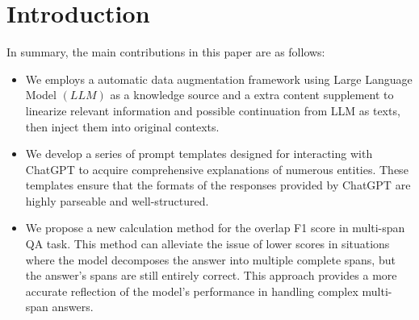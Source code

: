 \documentclass[mathematics,article,submit,moreauthors]{Definitions/mdpi}
\newcommand{\1}[1]{\mathds{1}\left[#1\right]}
\begin{document}

\section{Introduction}
\label{sec:intro}

In summary, the main contributions in this paper are as follows:
\begin{itemize}
	\item We employs a automatic data augmentation framework using Large Language Model \((LLM)\) as a knowledge source and a extra content supplement to linearize relevant information and possible continuation from LLM as texts, then inject them into original contexts. 

	\item We develop a series of prompt templates designed for interacting with ChatGPT to acquire comprehensive explanations of numerous entities. These templates ensure that the formats of the responses provided by ChatGPT are highly parseable and well-structured.
	
	\item We propose a new calculation method for the overlap F1 score in multi-span QA task. This method can alleviate the issue of lower scores in situations where the model decomposes the answer into multiple complete spans, but the answer’s spans are still entirely correct. This approach provides a more accurate reflection of the model’s performance in handling complex multi-span answers.
\end{itemize}

\end{document}
